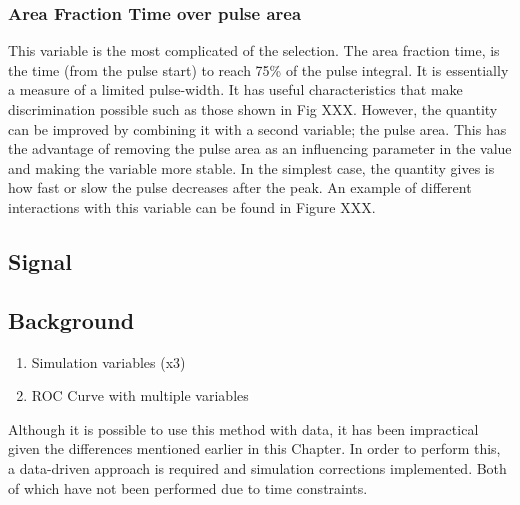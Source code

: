 \subsubsection{Area Fraction Time over pulse area}
This variable is the most complicated of the selection.
The area fraction time, is the time (from the pulse start) to reach 75\% of the pulse integral.
It is essentially a measure of a limited pulse-width.
It has useful characteristics that make discrimination possible such as those shown in Fig XXX.
However, the quantity can be improved by combining it with a second variable; the pulse area.
This has the advantage of removing the pulse area as an influencing parameter in the value and making the variable more stable.
In the simplest case, the quantity gives is how fast or slow the pulse decreases after the peak.
An example of different interactions with this variable can be found in Figure XXX.

\subsection{Signal}

\subsection{Background}


\begin{tcolorbox}[colback=red!5!white, colframe=red!50!black, title=Key Plots]
\begin{enumerate}
    \item Simulation variables (x3)
    \item ROC Curve with multiple variables
\end{enumerate}
\end{tcolorbox}

\par
Although it is possible to use this method with data, it has been impractical given the differences mentioned earlier in this Chapter.
In order to perform this, a data-driven approach is required and simulation corrections implemented.
Both of which have not been performed due to time constraints.
